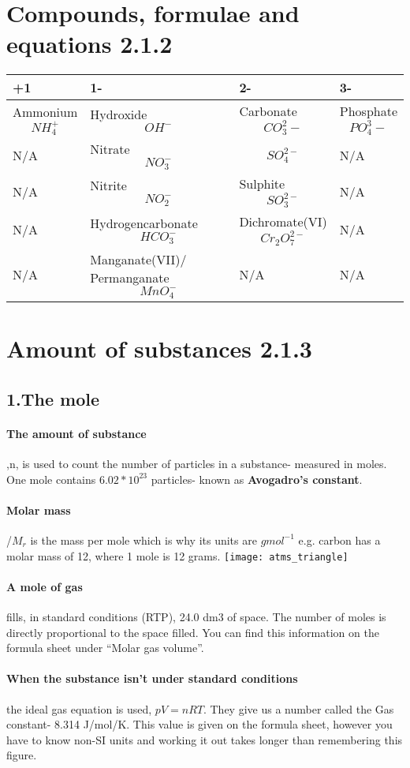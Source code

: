 \section{Compounds, formulae and equations 2.1.2}
\begin{tabular}{ |p{3cm}||p{4cm}||p{3cm}||p{3cm}|  }
 \hline
 +1    & 1- &2-&3-\\
 \hline
 Ammonium \[ NH_4^+ \]    & Hydroxide \[OH^-\]    &Carbonate \[CO_3^ 2-\]& Phosphate \[PO_4^ 3-\]\\
 N/A& Nitrate \[NO_3^-\]  & \[SO_4^{2-}\]  & N/A\\
 N/A& Nitrite \[NO_2^-\]  & Sulphite \[SO_3^{2-}\]& N/A\\
 \hline
 N/A & Hydrogencarbonate \[HCO_3^-\] & Dichromate(VI) \[Cr_2O_7^{2-}\] & N/A\\
 \hline
 N/A & Manganate(VII)/ Permanganate \[MnO_4^-\] &N/A&N/A\\
 \hline
\end{tabular}
\section{Amount of substances 2.1.3}
\subsection{1.The mole}
\paragraph{The amount of substance},n, is used to count the number of particles in a substance- measured in moles. One mole contains \textbf{\(6.02*10^{23}\)} particles- known as \textbf{Avogadro's constant}.
\paragraph{Molar mass} /\(M_r\) is the mass per mole which is why its units are \(gmol^{-1}\) e.g. carbon has a molar mass of 12, where 1 mole is 12 grams.
\newline\texttt{[image: atms\_triangle]}
\paragraph{A mole of gas} fills, in standard conditions (RTP), 24.0 dm3 of space. The number of moles is directly proportional to the space filled. You can find this information on the formula sheet under “Molar gas volume”.
\paragraph{When the substance isn’t under standard conditions} the ideal gas equation is used, \(pV=nRT\). They give us a number called the Gas constant- 8.314 J/mol/K. This value is given on the formula sheet, however you have to know non-SI units and working it out takes longer than remembering this figure.
